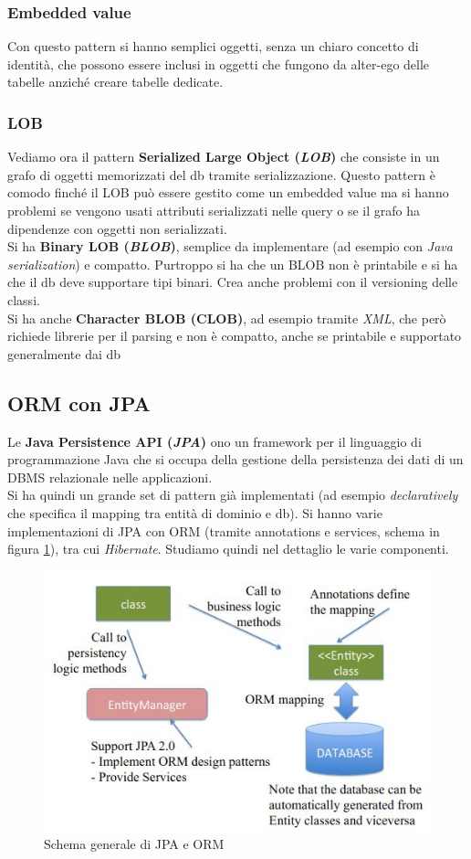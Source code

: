 \documentclass[a4paper,12pt, oneside]{book}
\begin{document}
\subsubsection{Embedded value}
Con questo pattern si hanno semplici oggetti, senza un chiaro concetto di
identità, che possono essere inclusi in oggetti che fungono da alter-ego delle
tabelle anziché creare tabelle dedicate.
\subsubsection{LOB}
Vediamo ora il pattern \textbf{Serialized Large Object (\textit{LOB})} che
consiste in un grafo di oggetti memorizzati del db tramite
serializzazione. Questo pattern è comodo finché il LOB può essere gestito come
un embedded value ma si hanno problemi se vengono usati attributi serializzati
nelle query o se il grafo ha dipendenze con oggetti non serializzati.\\
Si ha \textbf{Binary LOB (\textit{BLOB})}, semplice da implementare (ad esempio
con 
\textit{Java serialization}) e compatto. Purtroppo si ha che un BLOB non è
printabile e si ha che il db deve supportare tipi binari. Crea anche problemi
con il versioning delle classi.\\
Si ha anche \textbf{Character BLOB (CLOB)}, ad esempio tramite \textit{XML}, che
però richiede librerie per il parsing e non è compatto, anche se printabile e
supportato generalmente dai db
\subsection{ORM con JPA}
Le \textbf{Java Persistence API (\textit{JPA})} ono un framework per il
linguaggio di programmazione Java che si occupa della gestione della persistenza
dei dati di un DBMS relazionale nelle applicazioni.\\
Si ha quindi un grande set di pattern già implementati (ad esempio
\textit{declaratively} che specifica il mapping tra entità di dominio e db). Si
hanno varie implementazioni di JPA con ORM (tramite annotations e services,
schema in figura \ref{fig:jo}), tra
cui \textit{Hibernate}. Studiamo quindi nel dettaglio le varie componenti.
\begin{figure}
  \centering
  \includegraphics[scale = 0.65]{img/jpaorm.jpg}
  \caption{Schema generale di JPA e ORM}
  \label{fig:jo}
\end{figure}
\end{document}
